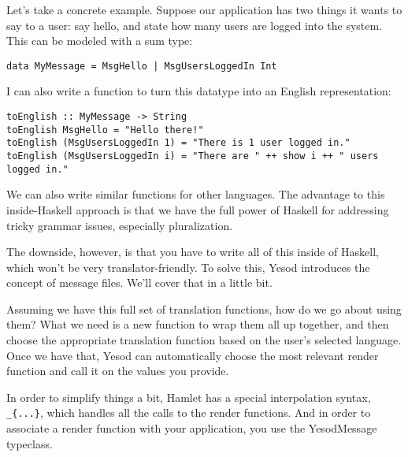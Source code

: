Let's take a concrete example. Suppose our application has two things it wants to say to a user: say hello, and state how many users are logged into the system. This can be modeled with a sum type:

\begin{lstlisting}
data MyMessage = MsgHello | MsgUsersLoggedIn Int
\end{lstlisting}

I can also write a function to turn this datatype into an English representation:

\begin{lstlisting}
toEnglish :: MyMessage -> String
toEnglish MsgHello = "Hello there!"
toEnglish (MsgUsersLoggedIn 1) = "There is 1 user logged in."
toEnglish (MsgUsersLoggedIn i) = "There are " ++ show i ++ " users logged in."
\end{lstlisting}

We can also write similar functions for other languages. The advantage to this inside-Haskell approach is that we have the full power of Haskell for addressing tricky grammar issues, especially pluralization.


The downside, however, is that you have to write all of this inside of Haskell, which won't be very translator-friendly. To solve this, Yesod introduces the concept of message files. We'll cover that in a little bit.

Assuming we have this full set of translation functions, how do we go about using them? What we need is a new function to wrap them all up together, and then choose the appropriate translation function based on the user's selected language. Once we have that, Yesod can automatically choose the most relevant render function and call it on the values you provide.

In order to simplify things a bit, Hamlet has a special interpolation syntax, \lstinline'_{...}', which handles all the calls to the render functions. And in order to associate a render function with your application, you use the YesodMessage typeclass.

